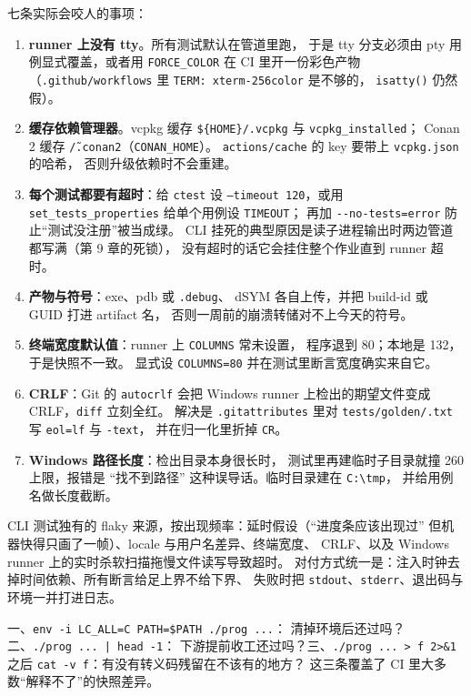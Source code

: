 \documentclass[12pt,a4paper,fontset=fandol]{ctexbook}
\newcommand{\Fn}[1]{\texttt{#1()}}
\newcommand{\Tp}[1]{\texttt{#1}}
\newcommand{\Bk}{\allowbreak}
\begin{document}
七条实际会咬人的事项：

\begin{enumerate}
\item \textbf{runner 上没有 tty}。所有测试默认在管道里跑，
      于是 tty 分支必须由 pty 用例显式覆盖，或者用 \Tp{FORCE\_COLOR}
      在 CI 里开一份彩色产物（\lstinline|.github/workflows| 里
      \lstinline|TERM: xterm-256color| 是不够的，
      \Fn{isatty} 仍然假）。
\item \textbf{缓存依赖管理器}。vcpkg 缓存
      \Tp{\$\{HOME\}/.vcpkg} 与 \Tp{vcpkg\_installed}；
      Conan 2 缓存 \Tp{\~/.conan2}（\lstinline|CONAN_HOME|）。
      \Tp{actions/cache} 的 key 要带上 \Tp{vcpkg.json} 的哈希，
      否则升级依赖时不会重建。
\item \textbf{每个测试都要有超时}：给 \lstinline|ctest| 设
      \Tp{--timeout 120}，或用 \Tp{set\Bk\_tests\Bk\_properties}
      给单个用例设 \Tp{TIMEOUT}；
      再加 \lstinline|--no-tests=error| 防止``测试没注册''被当成绿。
      CLI 挂死的典型原因是读子进程输出时两边管道都写满（第 9 章的死锁），
      没有超时的话它会挂住整个作业直到 runner 超时。
\item \textbf{产物与符号}：exe、pdb 或 \Tp{.debug}、
      dSYM 各自上传，并把 build-id 或 GUID 打进 artifact 名，
      否则一周前的崩溃转储对不上今天的符号。
\item \textbf{终端宽度默认值}：runner 上 \Tp{COLUMNS} 常未设置，
      程序退到 80；本地是 132，于是快照不一致。
      显式设 \Tp{COLUMNS=80} 并在测试里断言宽度确实来自它。
\item \textbf{CRLF}：Git 的 \lstinline|autocrlf| 会把 Windows runner
      上检出的期望文件变成 CRLF，\lstinline|diff| 立刻全红。
      解决是 \Tp{.gitattributes} 里对 \Tp{tests/golden/\*.txt}
      写 \lstinline|eol=lf| 与 \lstinline|-text|，
      并在归一化里折掉 \Tp{CR}。
\item \textbf{Windows 路径长度}：检出目录本身很长时，
      测试里再建临时子目录就撞 260 上限，报错是 ``找不到路径''
      这种误导话。临时目录建在 \Tp{C:\textbackslash tmp}，
      并给用例名做长度截断。
\end{enumerate}

CLI 测试独有的 flaky 来源，按出现频率：延时假设（``进度条应该出现过''
但机器快得只画了一帧）、locale 与用户名差异、终端宽度、
CRLF、以及 Windows runner 上的实时杀软扫描拖慢文件读写导致超时。
对付方式统一是：注入时钟去掉时间依赖、所有断言给足上界不给下界、
失败时把 \Tp{stdout}、\Tp{stderr}、退出码与环境一并打进日志。

\begin{note}[title={本地全绿、CI 变红时的前三个检查}]
一、\lstinline|env -i LC_ALL=C PATH=$PATH ./prog ...|：
清掉环境后还过吗？二、\Tp{./prog ... | head -1}：
下游提前收工还过吗？三、\lstinline|./prog ... > f 2>&1| 之后
\lstinline|cat -v f|：有没有转义码残留在不该有的地方？
这三条覆盖了 CI 里大多数``解释不了''的快照差异。
\end{note}
\end{document}
